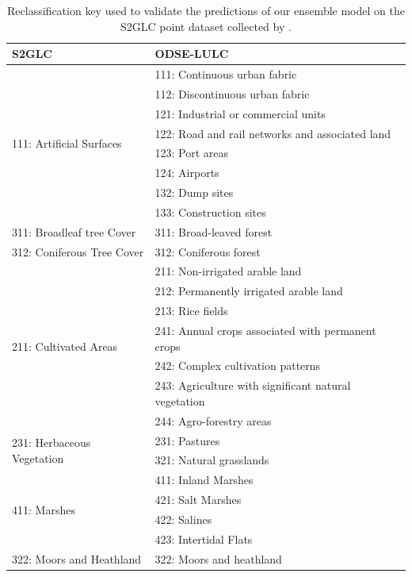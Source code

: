         \begin{table}[!hbt]
        \centering
        \caption{Reclassification key used to validate the predictions of our ensemble model on the S2GLC point dataset collected by \citet{malinowski2020}.}
        \label{tab:malinowski_keys}
        \begin{tabular}{@{}ll@{}}
        \toprule
        S2GLC &  ODSE-LULC \\ \midrule
        \multirow{8}{*}{111: Artificial Surfaces} & 111: Continuous urban fabric \\
         & 112: Discontinuous urban fabric \\
         & 121: Industrial or commercial units \\
         & 122: Road and rail networks and associated land \\
         & 123: Port areas \\
         & 124: Airports \\
         & 132: Dump sites \\
         & 133: Construction sites \\ \midrule
        311: Broadleaf tree Cover & 311: Broad-leaved forest \\ \midrule
        312: Coniferous Tree Cover & 312: Coniferous forest \\ \midrule
        \multirow{7}{*}{211: Cultivated Areas} & 211: Non-irrigated arable land \\
         & 212: Permanently irrigated arable land \\
         & 213: Rice fields \\
         & 241: Annual crops associated with permanent crops \\
         & 242: Complex cultivation patterns \\
         & 243: Agriculture with significant natural vegetation \\
         & 244: Agro-forestry areas \\ \midrule
        \multirow{2}{*}{231: Herbaceous Vegetation} & 231: Pastures \\
         & 321: Natural grasslands \\ \midrule
        \multirow{4}{*}{411: Marshes} & 411: Inland Marshes \\
         & 421: Salt Marshes \\
         & 422: Salines \\
         & 423: Intertidal Flats \\ \midrule
        322: Moors and Heathland & 322: Moors and heathland \\ \midrule

\end{tabular}
\end{table}
